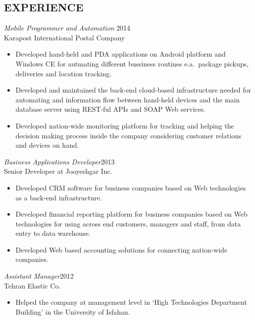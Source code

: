 \documentclass[margin, 10pt]{res} %
\begin{document}
\begin{resume}
 
\section{EXPERIENCE}

{\sl Mobile Programmer and Automation} \hfill 2014 \\
Karapost International Postal Company

\begin{itemize} \itemsep -2pt %
\item Developed hand-held and PDA applications on Android platform and Windows CE for autmating different bussiness
  routines e.a.\ package pickups, deliveries and location tracking.
\item Developed and maintained the back-end cloud-based infrastructure needed for automating and information flow between
  hand-held devices and the main database server using REST-ful APIs and SOAP Web services.
\item Developed nation-wide monitoring platform for tracking and helping the
  decision making process inside the company considering customer relations and devices on hand.
\end{itemize}
 
{\sl Business Applications Developer}\hfill 2013 \\
Senior Developer at Jooyeshgar Inc.
\begin{itemize} 
\item Developed CRM software for business companies based on Web technologies as a back-end infrastructure.
\item Developed financial reporting platform for business companies based on Web
  technologies for using across end customers, managers and staff, from data entry
  to data warehouse.
\item Developed Web based accounting solutions for connecting nation-wide companies.
\end{itemize} 

{\sl Assistant Manager}\hfill 2012 \\
Tehran Elastic Co.
\begin{itemize}
\item Helped the company at management level in `High Technologies Department
  Building' in the University of Isfahan.
\end{itemize} 


\end{resume}
\end{document}

